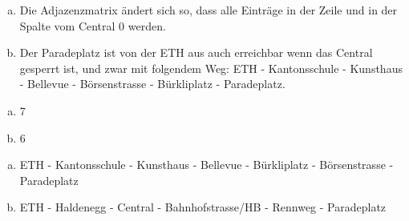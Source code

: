 \begin{lsg}
\hfill
\begin{enumerate}[(a)]
\item Die Adjazenzmatrix \"andert sich so, dass alle Eintr\"age in der Zeile und in der Spalte vom Central 0 werden.
\item Der Paradeplatz ist von der ETH aus auch erreichbar wenn das Central gesperrt ist, und zwar mit folgendem Weg: ETH - Kantonsschule - Kunsthaus - Bellevue - B\"orsenstrasse - B\"urkliplatz - Paradeplatz.
\end{enumerate}
\end{lsg}

\begin{lsg}
\hfill
\begin{enumerate}[(a)]
\item 7 
\item 6
\end{enumerate}
\end{lsg}

\begin{lsg}
\hfill
\begin{enumerate}[(a)]
\item ETH - Kantonsschule - Kunsthaus - Bellevue - B\"urkliplatz - B\"orsenstrasse - Paradeplatz
\item ETH - Haldenegg - Central - Bahnhofstrasse/HB - Rennweg - Paradeplatz
\end{enumerate}\end{lsg}



